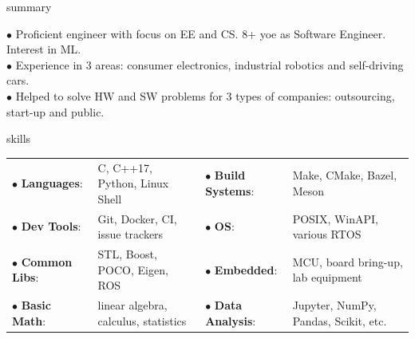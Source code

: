 \documentclass{template}
\begin{document}
\begin{rSection}{summary}

$\bullet$ Proficient engineer with focus on EE and CS. 8+ yoe as Software Engineer. Interest in ML. \\
$\bullet$ Experience in 3 areas: consumer electronics, industrial robotics and self-driving cars.   \\
$\bullet$ Helped to solve HW and SW problems for 3 types of companies: outsourcing, start-up and public.

\end{rSection}

\begin{rSection}{skills}
\begin{tabular}{llll}

$\bullet$ \textbf{Languages}:   & C, C++17, Python, Linux Shell        & $\bullet$ \textbf{Build Systems}: & Make, CMake, Bazel, Meson            \\
$\bullet$ \textbf{Dev Tools}:   & Git, Docker, CI, issue trackers      & $\bullet$ \textbf{OS}:            & POSIX, WinAPI, various RTOS          \\
$\bullet$ \textbf{Common Libs}: & STL, Boost, POCO, Eigen, ROS         & $\bullet$ \textbf{Embedded}:      & MCU, board bring-up, lab equipment   \\
$\bullet$ \textbf{Basic Math}:  & linear algebra, calculus, statistics & $\bullet$ \textbf{Data Analysis}: & Jupyter, NumPy, Pandas, Scikit, etc. \\

\end{tabular}
\end{rSection}
\end{document}
